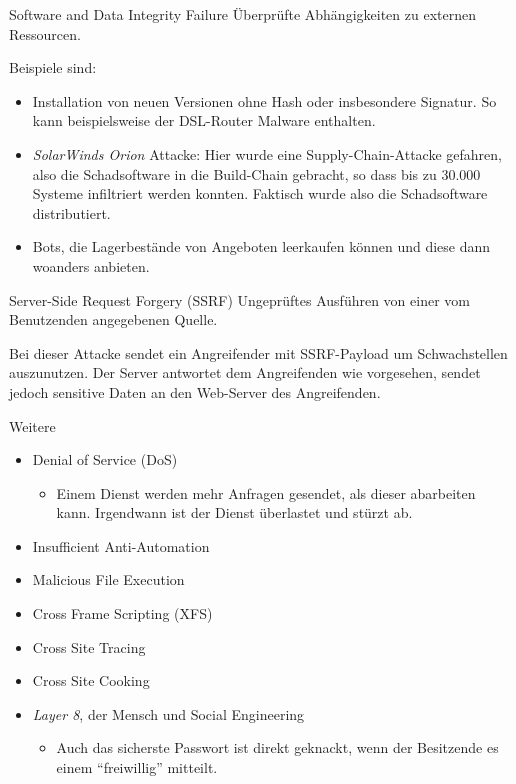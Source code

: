 \begin{defi}{Software and Data Integrity Failure}
    Überprüfte Abhängigkeiten zu externen Ressourcen.

    Beispiele sind:
    \begin{itemize}
        \item Installation von neuen Versionen ohne Hash oder insbesondere Signatur.
              So kann beispielsweise der DSL-Router Malware enthalten.
        \item \emph{SolarWinds Orion} Attacke: Hier wurde eine Supply-Chain-Attacke gefahren, also die Schadsoftware in die Build-Chain gebracht, so dass bis zu 30.000 Systeme infiltriert werden konnten.
              Faktisch wurde also die Schadsoftware distributiert.
        \item Bots, die Lagerbestände von Angeboten leerkaufen können und diese dann woanders anbieten.
    \end{itemize}
\end{defi}

\begin{defi}{Server-Side Request Forgery (SSRF)}
    Ungeprüftes Ausführen von einer vom Benutzenden angegebenen Quelle.

    Bei dieser Attacke sendet ein Angreifender mit SSRF-Payload um Schwachstellen auszunutzen.
    Der Server antwortet dem Angreifenden wie vorgesehen, sendet jedoch sensitive Daten an den Web-Server des Angreifenden.
\end{defi}

\begin{bonus}{Weitere}
    \begin{itemize}
        \item Denial of Service (DoS)
              \begin{itemize}
                  \item Einem Dienst werden mehr Anfragen gesendet, als dieser abarbeiten kann.
                        Irgendwann ist der Dienst überlastet und stürzt ab.
              \end{itemize}
        \item Insufficient Anti-Automation
        \item Malicious File Execution
        \item Cross Frame Scripting (XFS)
        \item Cross Site Tracing
        \item Cross Site Cooking
        \item \emph{Layer 8}, der Mensch und Social Engineering
              \begin{itemize}
                  \item Auch das sicherste Passwort ist direkt geknackt, wenn der Besitzende es einem \enquote{freiwillig} mitteilt.
              \end{itemize}
    \end{itemize}
\end{bonus}

